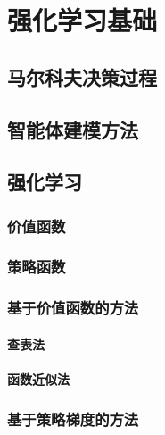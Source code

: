 \documentclass{standalone}
\begin{document}
\chapter{强化学习基础}
\section{马尔科夫决策过程}

\section{智能体建模方法}

\section{强化学习}

\subsection{价值函数}
\subsection{策略函数}
\subsection{基于价值函数的方法}
\subsubsection{查表法}
\subsubsection{函数近似法}

\subsection{基于策略梯度的方法}
\end{document}
